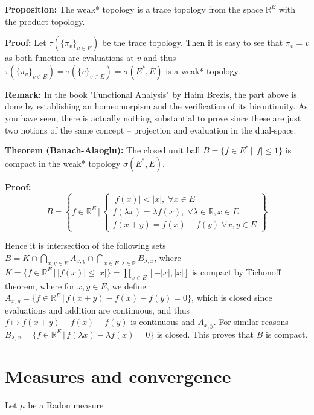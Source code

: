 \documentclass{article}
\begin{document}
\vspace{1ex}
\textbf{Proposition:} The weak* topology is a trace topology from the space
$\mathbb{R}^E$ with the product topology.

\vspace{1ex}
\textbf{Proof:} Let $\tau(\{\pi_v\}_{v\in E})$ be the trace topology. Then it
is easy to see that $\pi_v=v$ as both function are evaluations at $v$ and thus
$\tau(\{\pi_v\}_{v\in E})=\tau(\{v\}_{v\in E})=\sigma(E^*, E)$ is a weak*
topology.

\vspace{1ex}
\textbf{Remark:} In the book "Functional Analysis" by Haim Brezis, the part
above is done by establishing an homeomorpism and the verification of its bicontinuity.
As you have seen, there is actually nothing substantial to prove since these are 
just two notions of the same concept – projection and evaluation in the dual-space.

\vspace{1ex}
\textbf{Theorem (Banach-Alaoglu):} The closed unit ball $B=\{f\in E^*\,|\,|
f|\leq 1\}$ is compact in the weak* topology $\sigma(E^*, E)$.

\vspace{1ex}
\textbf{Proof:}
\[ B=\left\{f\in\mathbb{R}^E\,|\,
\begin{cases}
    |f(x)|<|x|,\;\forall x\in E\\
    f(\lambda x)=\lambda f(x),\;\forall\lambda\in\mathbb{R}, x\in E\\
    f(x+y)=f(x)+f(y)\;\forall x,y\in E
\end{cases}
\right\} \] 

Hence it is intersection of the following sets $B=K\cap\bigcap_{x,y\in E} A_{x,y}
\cap\bigcap_{x\in E, \lambda\in\mathbb{R}}B_{\lambda,x}$, where $K=\{f\in\mathbb
{R}^E\,|\,|f(x)|\leq|x|\}=\prod_{x\in E}[-|x|, |x|]$ is compact by Tichonoff
theorem, where for $x,y\in E$, we define $A_{x,y}=\{f\in\mathbb{R}^E\,|\,f(x+y)-
f(x)-f(y)=0\}$, which is closed since evaluations and addition are continuous, and
thus $f\mapsto f(x+y)-f(x)-f(y)$ is continuous and $A_{x,y}$. For similar
reasons $B_{\lambda, x}=\{f\in\mathbb{R}^E\,|\,f(\lambda x)-\lambda f(x)=0\}$ is
closed. This proves that $B$ is compact.


\section{Measures and convergence}

Let $\mu$ be a Radon measure
\end{document}
